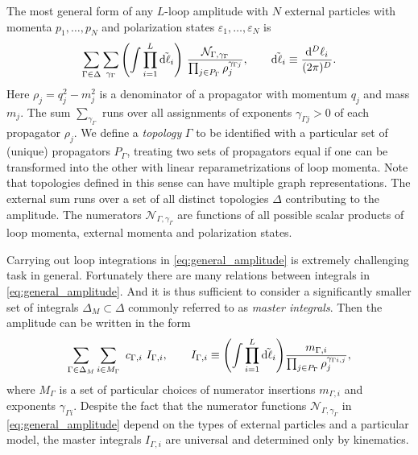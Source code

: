 The most general form of any $L$-loop amplitude with $N$ external particles with momenta $p_1,\ldots,p_N$ and polarization states $\varepsilon_1,\ldots,\varepsilon_N$ is
\begin{equation}
  \sum_{\Gamma \in \Delta} \sum_{\gamma_\Gamma} \qty(\int \prod_{i=1}^{L} \tilde{\dd{\ell_i}}) ~ 
  \frac{\mathcal{N}_{\Gamma,\gamma_\Gamma}%
    }{\prod_{j\in P_\Gamma} \rho_j^{\gamma_{\Gamma j}}},
    \qquad \tilde{\dd{\ell_i}} \equiv \frac{\dd[D]{\ell_i}}{(2\pi)^{D}}.
  \label{eq:general_amplitude}
\end{equation}
Here $\rho_j = q_j^2 - m_j^2$ is a denominator of a propagator with momentum $q_j$ and mass $m_j$. The sum $\sum_{\gamma_\Gamma}$ runs over all assignments
of exponents $\gamma_{\Gamma j} > 0$ of each propagator $\rho_j$. 
We define a \emph{topology} $\Gamma$ to be identified with a particular set of (unique) propagators $P_\Gamma$,
treating two sets of propagators equal if one can be transformed into the other with linear reparametrizations of loop momenta.
Note that topologies defined in this sense can have multiple graph representations.
The external sum runs over a set of all distinct topologies $\Delta$ contributing to the amplitude.
The numerators $\mathcal{N}_{\Gamma,\gamma_\Gamma}$
are functions of all possible scalar products of loop momenta, external momenta and polarization states.

Carrying out loop integrations in \cref{eq:general_amplitude} is extremely challenging task in general.
Fortunately there are many relations between integrals in \cref{eq:general_amplitude}.
And it is thus sufficient to consider a significantly smaller set of integrals $\Delta_M \subset \Delta$ commonly referred to
as \emph{master integrals}. Then the amplitude can be written in the form
\begin{equation}
  \sum_{\Gamma \in \Delta_M} \sum_{i\in M_\Gamma} ~ c_{\Gamma,i} ~ I_{\Gamma,i}, 
    \qquad I_{\Gamma,i} \equiv 
      \qty(\int \prod_{i=1}^{L} \tilde{\dd{\ell_i}}) \frac{m_{\Gamma,i}}{\prod_{j\in P_\Gamma} \rho_j^{\gamma_{\Gamma i,j}}},
  \label{eq:amplitude_integrated}
\end{equation}
where $M_{\Gamma}$ is a set of particular choices of numerator insertions $m_{\Gamma,i}$ and exponents $\gamma_{\Gamma i}$.
Despite the fact that the numerator functions $\mathcal{N}_{\Gamma,\gamma_\Gamma}$ in \cref{eq:general_amplitude} depend on the types of external particles and a particular model,
the master integrals $I_{\Gamma,i}$ are universal and determined only by kinematics.


